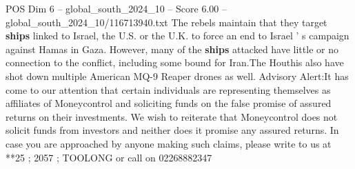 \begin{textsample}{POS Dim 6 – global\_south\_2024\_10 – Score 6.00 – global\_south\_2024\_10/116713940.txt}
The rebels maintain that they target \textbf{ships} linked to Israel, the U.S. or the U.K. to force an end to Israel ' s campaign against Hamas in Gaza.
However, many of the \textbf{ships} attacked have little or no connection to the conflict, including some bound for Iran.The Houthis also have shot down multiple American MQ-9 Reaper drones as well.
Advisory Alert:It has come to our attention that certain individuals are representing themselves as affiliates of Moneycontrol and soliciting funds on the false promise of assured returns on their investments.
We wish to reiterate that Moneycontrol does not solicit funds from investors and neither does it promise any assured returns.
In case you are approached by anyone making such claims, please write to us at **25 ; 2057 ; TOOLONG or call on 02268882347

\end{textsample}
